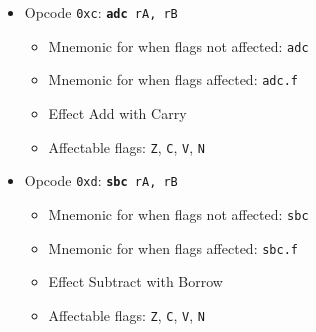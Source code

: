 \documentclass{article}
\begin{document}
\begin{itemize}
	\item Opcode \texttt{0xc}:
		\texttt{\textbf{adc} rA, rB}
		\begin{itemize}
		\item Mnemonic for when flags not affected: \texttt{adc}
		\item Mnemonic for when flags affected: \texttt{adc.f}
		\item Effect Add with Carry
		\item Affectable flags:
			\texttt{Z}, \texttt{C}, \texttt{V}, \texttt{N}
		\end{itemize}
	\item Opcode \texttt{0xd}:
		\texttt{\textbf{sbc} rA, rB}
		\begin{itemize}
		\item Mnemonic for when flags not affected: \texttt{sbc}
		\item Mnemonic for when flags affected: \texttt{sbc.f}
		\item Effect Subtract with Borrow
		\item Affectable flags:
			\texttt{Z}, \texttt{C}, \texttt{V}, \texttt{N}
		\end{itemize}
	\end{itemize}
\end{document}
